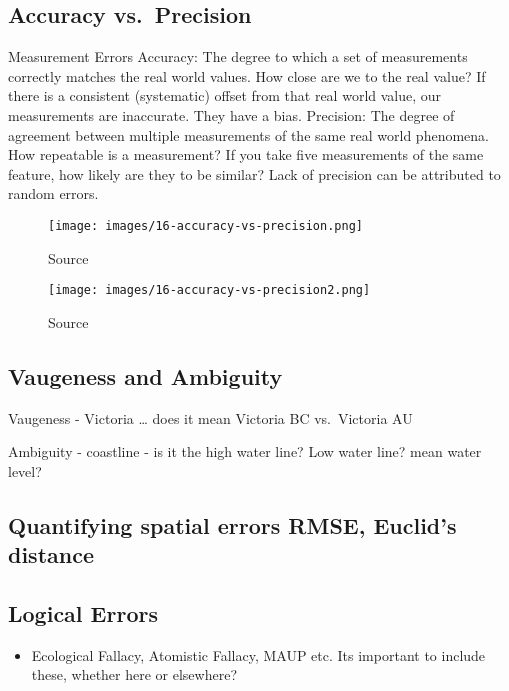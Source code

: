 \documentclass[
]{book}
\providecommand{\tightlist}{%
  \setlength{\itemsep}{0pt}\setlength{\parskip}{0pt}}
\begin{document}
\hypertarget{accuracy-vs.-precision}{%
\subsection{Accuracy vs.~Precision}\label{accuracy-vs.-precision}}

Measurement Errors
Accuracy:
The degree to which a set of measurements correctly matches the real world values. How close are we to the real value?
If there is a consistent (systematic) offset from that real world value, our measurements are inaccurate. They have a bias.
Precision:
The degree of agreement between multiple measurements of the same real world phenomena. How repeatable is a measurement?
If you take five measurements of the same feature, how likely are they to be similar? Lack of precision can be attributed to random errors.

\begin{figure}
\centering
\texttt{[image: images/16-accuracy-vs-precision.png]}
\caption{Source}
\end{figure}

\begin{figure}
\centering
\texttt{[image: images/16-accuracy-vs-precision2.png]}
\caption{Source}
\end{figure}

\hypertarget{vaugeness-and-ambiguity}{%
\subsection{Vaugeness and Ambiguity}\label{vaugeness-and-ambiguity}}

Vaugeness - Victoria \ldots{} does it mean Victoria BC vs.~Victoria AU

Ambiguity - coastline - is it the high water line? Low water line? mean water level?

\hypertarget{quantifying-spatial-errors-rmse-euclids-distance}{%
\subsection{Quantifying spatial errors RMSE, Euclid's distance}\label{quantifying-spatial-errors-rmse-euclids-distance}}

\hypertarget{logical-errors}{%
\subsection{Logical Errors}\label{logical-errors}}

\begin{itemize}
\tightlist
\item
  Ecological Fallacy, Atomistic Fallacy, MAUP etc. Its important to include these, whether here or elsewhere?
\end{itemize}
\end{document}
